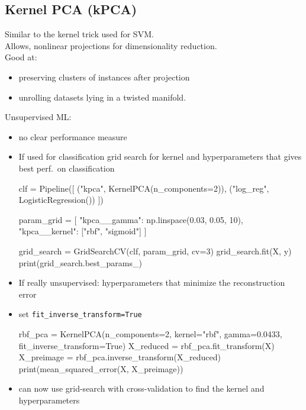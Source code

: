 \subsection{Kernel PCA (kPCA)}
Similar to the kernel trick used for SVM.\\
Allows, nonlinear projections for dimensionality reduction.\\
Good at:
\begin{itemize}
    \item preserving clusters of instances after projection
    \item unrolling datasets lying in a twisted manifold.
\end{itemize}

Unsupervised ML:
\begin{itemize}
    \item[\arrow] no clear performance measure
    \item If used for classification \arrow grid search for kernel and hyperparameters that gives best perf.\ on
        classification
        \begin{python}
        clf = Pipeline([
            ("kpca", KernelPCA(n_components=2)),
            ("log_reg", LogisticRegression())
            ])

        param_grid = [{
            "kpca__gamma": np.linspace(0.03, 0.05, 10),
            "kpca__kernel": ["rbf", "sigmoid"]
            }]

        grid_search = GridSearchCV(clf, param_grid, cv=3)
        grid_search.fit(X, y)
        print(grid_search.best_params_)
        \end{python}
    \item If really unsupervised: \arrow hyperparameters that minimize the reconstruction error
    \item[\arrow] set \verb;fit_inverse_transform=True;
        \begin{python}
        rbf_pca = KernelPCA(n_components=2, kernel="rbf", gamma=0.0433, fit_inverse_transform=True)
        X_reduced = rbf_pca.fit_transform(X)
        X_preimage = rbf_pca.inverse_transform(X_reduced)
        print(mean_squared_error(X, X_preimage))
        \end{python}
    \item[\Arrow] can now use grid-search with cross-validation to find the kernel and hyperparameters
\end{itemize}

